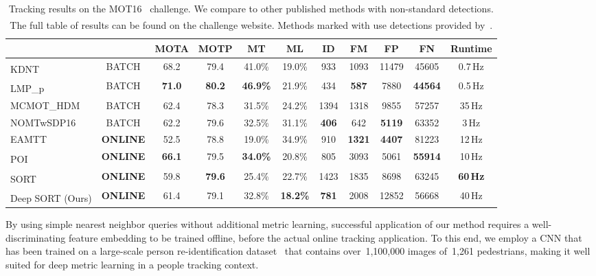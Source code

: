 \documentclass{article}
\begin{document}
\begin{table*}[t!]
    \centering
    \begin{tabular}{@{}lccccccccc@{\hskip7pt}c@{}}
\toprule
 & \multicolumn{1}{l}{} & \textbf{MOTA}  & \textbf{MOTP}  & \textbf{MT}  & \textbf{ML}  & \textbf{ID}  & \textbf{FM}  & \textbf{FP}  & \textbf{FN}  & \textbf{Runtime}  \\
\midrule
KDNT~\cite{yu2016poi}\textsuperscript{} & BATCH & 68.2 & 79.4 & 41.0\% & 19.0\% & 933 & 1093 & 11479 & 45605 & 0.7\,Hz \\
LMP\_p~\cite{keuper2016multi}\textsuperscript{} & BATCH & \textbf{71.0} & \textbf{80.2} & \textbf{46.9\%} & 21.9\% & 434 & \textbf{587} & 7880 & \textbf{44564} & 0.5\,Hz \\
MCMOT\_HDM~\cite{lee2016multi} & BATCH & 62.4 & 78.3 & 31.5\% & 24.2\% & 1394 & 1318 & 9855 & 57257 & 35\,Hz \\
NOMTwSDP16~\cite{choi2015near} & BATCH & 62.2 & 79.6 & 32.5\% & 31.1\% & \textbf{406} & 642 & \textbf{5119} & 63352 & 3\,Hz \\
\midrule
EAMTT~\cite{sanchez2016online} & \textbf{ONLINE} & 52.5 & 78.8 & 19.0\% & 34.9\% & 910 & \textbf{1321} & \textbf{4407} & 81223 & 12\,Hz \\
POI~\cite{yu2016poi}\textsuperscript{} & \textbf{ONLINE} & \textbf{66.1} & 79.5 & \textbf{34.0\%} & 20.8\% & 805 & 3093 & 5061 & \textbf{55914} & 10\,Hz \\
        SORT~\cite{Bewley2016_sort}\textsuperscript{} & \textbf{ONLINE} & 59.8 & \textbf{79.6} & 25.4\% & 22.7\% & 1423 & 1835 & 8698 & 63245 & \textbf{60\,Hz} \\
Deep SORT (Ours)\textsuperscript{} & \textbf{ONLINE} & 61.4 & 79.1 & 32.8\% & \textbf{18.2\%} & \textbf{781} & 2008 & 12852 & 56668 & 40\,Hz \\
\bottomrule
\end{tabular}
    \caption{Tracking results on the MOT16~\cite{milan2016mot16} challenge.
    We compare to other published methods with non-standard detections.
    The full table of results can be found on the challenge website.
    Methods marked with \textsuperscript{} use detections provided by~\cite{yu2016poi}.}
\label{tab:mot-results}
\end{table*}

By using simple nearest neighbor queries without additional metric learning,
successful application of our method requires a well-discriminating feature
embedding to be trained offline, before the actual online tracking application.
To this end, we employ a CNN that has been
trained on a large-scale person re-identification
dataset~\cite{Zheng2016} that contains over~1,100,000 images of~1,261
pedestrians, making it well suited for deep metric learning in a people
tracking context.
\end{document}
